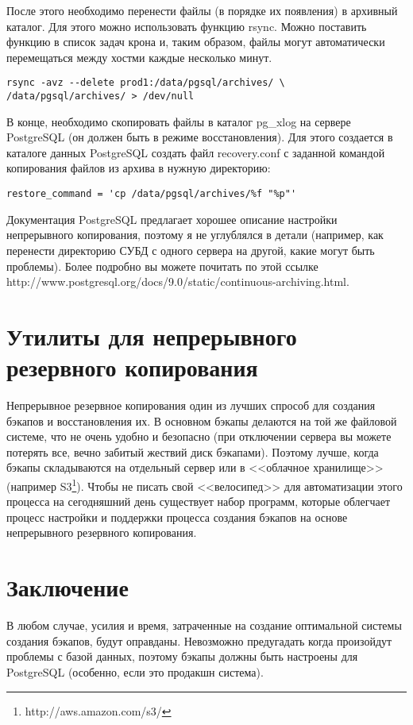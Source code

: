 После этого необходимо перенести файлы (в порядке их появления) в архивный каталог. 
Для этого можно использовать функцию rsync.
Можно поставить функцию в список задач крона и, таким образом, файлы могут автоматически перемещаться между 
хостми каждые несколько минут.
\begin{lstlisting}[label=lst:backups16,caption=Копирование WAL файлов на другой хост]
rsync -avz --delete prod1:/data/pgsql/archives/ \
/data/pgsql/archives/ > /dev/null
\end{lstlisting}

В конце, необходимо скопировать файлы в каталог pg\_xlog на сервере PostgreSQL (он должен быть в режиме восстановления). 
Для этого создается в каталоге данных PostgreSQL создать файл recovery.conf с заданной командой копирования 
файлов из архива в нужную директорию:
\begin{lstlisting}[label=lst:backups17,caption=recovery.conf]
restore_command = 'cp /data/pgsql/archives/%f "%p"'
\end{lstlisting}

Документация PostgreSQL предлагает хорошее описание настройки непрерывного копирования, поэтому я не углублялся в детали 
(например, как перенести директорию СУБД с одного сервера на другой, какие могут быть проблемы). Более подробно вы 
можете почитать по этой ссылке http://www.postgresql.org/docs/9.0/static/continuous-archiving.html.

\section{Утилиты для непрерывного резервного копирования}
Непрерывное резервное копирования один из лучших спрособ для создания бэкапов и восстановления их. В основном бэкапы делаются на той же файловой системе, что не очень удобно и безопасно (при отключении сервера вы можете потерять все, вечно забитый жествий диск бэкапами). Поэтому лучше, когда бэкапы складываются на отдельный сервер или в <<облачное хранилище>> (например S3\footnote{http://aws.amazon.com/s3/}). Чтобы не писать свой <<велосипед>> для автоматизации этого процесса на сегодняшний день существует набор программ, которые облегчает процесс настройки и поддержки процесса создания бэкапов на основе непрерывного резервного копирования.




\section{Заключение}
В любом случае, усилия и время, затраченные на создание оптимальной системы создания бэкапов, будут оправданы. 
Невозможно предугадать когда произойдут проблемы с базой данных, поэтому бэкапы должны быть настроены для PostgreSQL 
(особенно, если это продакшн система).
